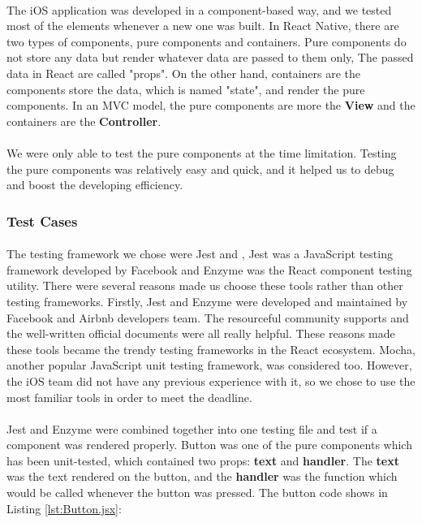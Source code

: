 \documentclass[12pt,a4paper]{article}
\begin{document}
          \paragraph{}The iOS application was developed in a component-based way, and we tested most of the elements whenever a new one was built. In React Native, there are two types of components, pure components and containers. Pure components do not store any data but render whatever data are passed to them only, The passed data in React are called "props". On the other hand, containers are the components store the data, which is named "state", and render the pure components. In an MVC model, the pure components are more the {\bf View} and the containers are the {\bf Controller}.
          
          \paragraph{}We were only able to test the pure components at the time limitation. Testing the pure components was relatively easy and quick, and it helped us to debug and boost the developing efficiency.

        \subsubsection{Test Cases} %
          \paragraph{}The testing framework we chose were Jest\cite{Jest} and \cite{Enzyme}, Jest was a JavaScript testing framework developed by Facebook and Enzyme was the React component testing utility. There were several reasons made us choose these tools rather than other testing frameworks. Firstly, Jest and Enzyme were developed and maintained by Facebook and Airbnb developers team. The resourceful community supports and the well-written official documents were all really helpful. These reasons made these tools became the trendy testing frameworks in the React ecosystem. Mocha, another popular JavaScript unit testing framework, was considered too. However, the iOS team did not have any previous experience with it, so we chose to use the most familiar tools in order to meet the deadline.
          
          \paragraph{}Jest and Enzyme were combined together into one testing file and test if a component was rendered properly. Button was one of the pure components which has been unit-tested, which contained two props: {\bf text} and {\bf handler}. The {\bf text} was the text rendered on the button, and the {\bf handler} was the function which would be called whenever the button was pressed. The button code shows in Listing \ref{lst:Button.jsx}:
        
\end{document}
